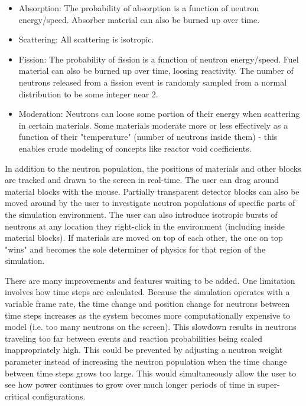 \documentclass{anstrans}
\begin{document}
\begin{itemize}

    \item Absorption: The probability of absorption is a function of neutron
        energy/speed.  Absorber material can also be burned up over time.

    \item Scattering: All scattering is isotropic.

    \item Fission: The probability of fission is a function of neutron
        energy/speed.  Fuel material can also be burned up over time, loosing
        reactivity.  The number of neutrons released from a fission event is
        randomly sampled from a normal distribution to be some integer near 2.

    \item Moderation: Neutrons can loose some portion of their energy when
        scattering in certain materials. Some materials moderate more or less
        effectively as a function of their "temperature" (number of neutrons
        inside them) - this enables crude modeling of concepts like reactor
        void coefficients.

\end{itemize}

In addition to the neutron population, the positions of materials and other
blocks are tracked and drawn to the screen in real-time.  The user can drag
around material blocks with the mouse.  Partially transparent detector blocks
can also be moved around by the user to investigate neutron populations of
specific parts of the simulation environment.  The user can also introduce
isotropic bursts of neutrons at any location they right-click in the
environment (including inside material blocks).  If materials are moved on top
of each other, the one on top "wins" and becomes the sole determiner of
physics for that region of the simulation.

There are many improvements and features waiting to be added.  One limitation
involves how time steps are calculated.  Because the simulation operates with
a variable frame rate, the time change and position change for neutrons
between time steps increases as the system becomes more computationally
expensive to model (i.e. too many neutrons on the screen).  This slowdown
results in neutrons traveling too far between events and reaction
probabilities being scaled inappropriately high.  This could be prevented by
adjusting a neutron weight parameter instead of increasing the neutron
population when the time change between time steps grows too large.  This
would simultaneously allow the user to see how power continues to grow over
much longer periods of time in super-critical configurations.  
\end{document}
